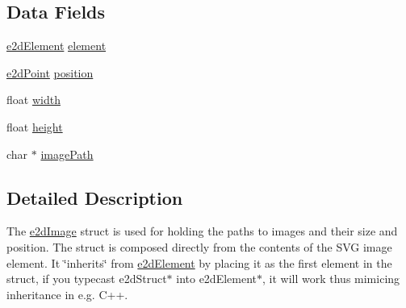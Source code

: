 \subsection*{Data Fields}
\begin{DoxyCompactItemize}
\item 
\hyperlink{structe2dElement}{e2d\-Element} \hyperlink{structe2dImage_a55bc7a3a0af41fba9e5b91f390c5928c}{element}
\item 
\hyperlink{structe2dPoint}{e2d\-Point} \hyperlink{structe2dImage_afa8983f25fd6aa6aca18feb07d8d2249}{position}
\item 
float \hyperlink{structe2dImage_ae426f00e82704fa09578f5446e22d915}{width}
\item 
float \hyperlink{structe2dImage_a48083b65ac9a863566dc3e3fff09a5b4}{height}
\item 
char $\ast$ \hyperlink{structe2dImage_afb14ab23ba86115c3b01ad4122943f89}{image\-Path}
\end{DoxyCompactItemize}


\subsection{Detailed Description}
The \hyperlink{structe2dImage}{e2d\-Image} struct is used for holding the paths to images and their size and position. The struct is composed directly from the contents of the S\-V\-G image element. It \char`\"{}inherits\char`\"{} from \hyperlink{structe2dElement}{e2d\-Element} by placing it as the first element in the struct, if you typecast e2d\-Struct$\ast$ into e2d\-Element$\ast$, it will work thus mimicing inheritance in e.\-g. C++. 

